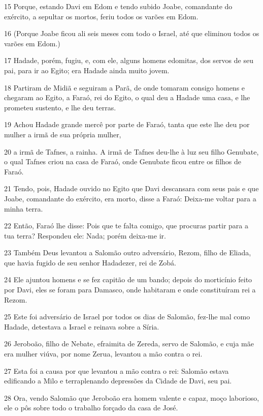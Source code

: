 \par 15 Porque, estando Davi em Edom e tendo subido Joabe, comandante do exército, a sepultar os mortos, feriu todos os varões em Edom.
\par 16 (Porque Joabe ficou ali seis meses com todo o Israel, até que eliminou todos os varões em Edom.)
\par 17 Hadade, porém, fugiu, e, com ele, alguns homens edomitas, dos servos de seu pai, para ir ao Egito; era Hadade ainda muito jovem.
\par 18 Partiram de Midiã e seguiram a Parã, de onde tomaram consigo homens e chegaram ao Egito, a Faraó, rei do Egito, o qual deu a Hadade uma casa, e lhe prometeu sustento, e lhe deu terras.
\par 19 Achou Hadade grande mercê por parte de Faraó, tanta que este lhe deu por mulher a irmã de sua própria mulher,
\par 20 a irmã de Tafnes, a rainha. A irmã de Tafnes deu-lhe à luz seu filho Genubate, o qual Tafnes criou na casa de Faraó, onde Genubate ficou entre os filhos de Faraó.
\par 21 Tendo, pois, Hadade ouvido no Egito que Davi descansara com seus pais e que Joabe, comandante do exército, era morto, disse a Faraó: Deixa-me voltar para a minha terra.
\par 22 Então, Faraó lhe disse: Pois que te falta comigo, que procuras partir para a tua terra? Respondeu ele: Nada; porém deixa-me ir.
\par 23 Também Deus levantou a Salomão outro adversário, Rezom, filho de Eliada, que havia fugido de seu senhor Hadadezer, rei de Zobá.
\par 24 Ele ajuntou homens e se fez capitão de um bando; depois do morticínio feito por Davi, eles se foram para Damasco, onde habitaram e onde constituíram rei a Rezom.
\par 25 Este foi adversário de Israel por todos os dias de Salomão, fez-lhe mal como Hadade, detestava a Israel e reinava sobre a Síria.
\par 26 Jeroboão, filho de Nebate, efraimita de Zereda, servo de Salomão, e cuja mãe era mulher viúva, por nome Zerua, levantou a mão contra o rei.
\par 27 Esta foi a causa por que levantou a mão contra o rei: Salomão estava edificando a Milo e terraplenando depressões da Cidade de Davi, seu pai.
\par 28 Ora, vendo Salomão que Jeroboão era homem valente e capaz, moço laborioso, ele o pôs sobre todo o trabalho forçado da casa de José.
